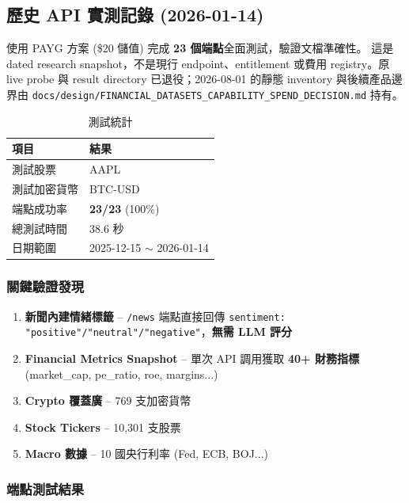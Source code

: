 \documentclass[11pt,a4paper]{article}
\begin{document}
\subsection{歷史 API 實測記錄 (2026-01-14)}

使用 PAYG 方案 (\$20 儲值) 完成 \textbf{23 個端點}全面測試，驗證文檔準確性。
這是 dated research snapshot，不是現行 endpoint、entitlement 或費用
registry。原 live probe 與 result directory 已退役；2026-08-01 的靜態
inventory 與後續產品邊界由
\texttt{docs/design/FINANCIAL\_DATASETS\_CAPABILITY\_SPEND\_DECISION.md}
持有。

\begin{table}[H]
\centering
\caption{測試統計}
\begin{tabular}{@{}ll@{}}
\toprule
\textbf{項目} & \textbf{結果} \\
\midrule
測試股票 & AAPL \\
測試加密貨幣 & BTC-USD \\
端點成功率 & \textbf{23/23} (100\%) \\
總測試時間 & 38.6 秒 \\
日期範圍 & 2025-12-15 $\sim$ 2026-01-14 \\
\bottomrule
\end{tabular}
\end{table}

\subsubsection{關鍵驗證發現}

\begin{enumerate}
    \item \textbf{新聞內建情緒標籤} -- \texttt{/news} 端點直接回傳 \texttt{sentiment: "positive"/"neutral"/"negative"}，\textbf{無需 LLM 評分}
    \item \textbf{Financial Metrics Snapshot} -- 單次 API 調用獲取 \textbf{40+ 財務指標} (market\_cap, pe\_ratio, roe, margins...)
    \item \textbf{Crypto 覆蓋廣} -- 769 支加密貨幣
    \item \textbf{Stock Tickers} -- 10,301 支股票
    \item \textbf{Macro 數據} -- 10 國央行利率 (Fed, ECB, BOJ...)
\end{enumerate}

\subsubsection{端點測試結果}
\end{document}
